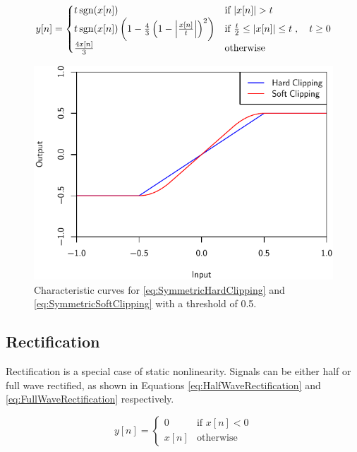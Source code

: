 		\begin{equation}
			y[n] = \begin{cases}
				t\operatorname{sgn}(x[n]) & \text{if $\left|x[n]\right| > t$} \\
				t\operatorname{sgn}(x[n]) \left( 1 - \frac{4}{3} \left( 1 - \left|\frac{x[n]}{t}\right| \right)^{2}
				           \right) & \text{if $\frac{t}{2} \leq \left|x[n]\right| \leq t$} \\
				\frac{4x[n]}{3} & \text{otherwise}
			\end{cases}, \quad t \geq 0
			\label{eq:SymmetricSoftClipping}
		\end{equation}

		\begin{figure}[h!]
			\centering
			\includegraphics{chapter3/Images/Clipping.pdf}
			\caption{Characteristic curves for \ref{eq:SymmetricHardClipping} and
				 \ref{eq:SymmetricSoftClipping} with a threshold of 0.5.}
			\label{fig:Clipping}
		\end{figure}

	\subsection{Rectification}
	\label{sec:Excitation-Methods-Rectification}
		Rectification is a special case of static nonlinearity. Signals can be either half or full wave rectified,
		as shown in Equations \ref{eq:HalfWaveRectification} and \ref{eq:FullWaveRectification} respectively.

		\begin{equation}
			y[n] = \begin{cases}
				0 & \text{if $x[n] < 0$} \\
				x[n] & \text{otherwise}
			\end{cases}
			\label{eq:HalfWaveRectification}
		\end{equation}

